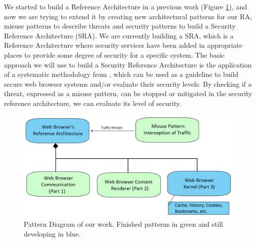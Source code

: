 \documentclass[prodmode,acmtecs]{acmsmall}
\begin{document}
We started to build a Reference Architecture in a previous work (Figure \ref{fig:relations}), and now we are trying to extend it by creating new architectural patterns for our RA, misuse patterns to describe threats and security patterns to build a Security Reference Architecture (SRA). We are currently building a SRA, which is a Reference Architecture where security services have been added in appropriate places to provide some degree of security for a specific system. The basic approach we will use to build a Security Reference Architecture is the application of a systematic methodology from \cite{fernandez2006methodology,Fernandez2011,Fernandez2015}, which can be used as a guideline to build secure web browser systems and/or evaluate their security levels. By checking if a threat, expressed as a misuse pattern, can be stopped or mitigated in the security reference architecture, we can evaluate its level of security.

    \begin{figure}[h!t]
      \vspace*{0.8cm}
      \centering
      \hspace{0.5cm}\includegraphics[scale=0.43]{figures/relations-finish.png}
      \vspace*{0.5cm}
      \caption{Pattern Diagram of our work. Finished patterns in green and still developing in blue.}
      \label{fig:relations}
    \end{figure}
\end{document}
